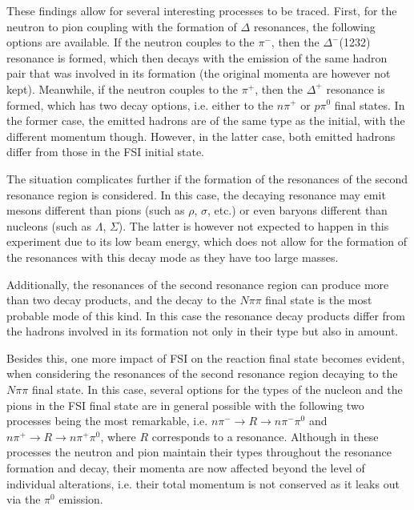 These findings allow for several interesting processes to be traced. First, for the neutron to pion coupling with the formation of $\Delta$ resonances, the following options are available. If the neutron couples to the $\pi^{-}$, then the $\Delta^{-}$(1232) resonance is formed, which then decays with the emission of the same hadron pair that was involved in its formation (the original momenta are however not kept). Meanwhile, if the neutron couples to the $\pi^{+}$, then the $\Delta^{+}$ resonance is formed, which has two decay options, i.e. either to the $n\pi^{+}$ or $p\pi^{0}$ final states. In the former case, the emitted hadrons are of the same type as the initial, with the different momentum though. However, in the latter case, both emitted hadrons differ from those in the FSI initial state.

The situation complicates further if the formation of the resonances of the second resonance region is considered. In this case, the decaying resonance may emit mesons different than pions (such as $\rho$, $\sigma$, etc.) or even baryons different than nucleons (such as $\Lambda$, $\Sigma$). The latter is however not expected to happen in this experiment due to its low beam energy, which does not allow for the formation of the resonances with this decay mode as they have too large masses.

Additionally, the resonances of the second resonance region can produce more than two decay products, and the decay to the $N\pi\pi$ final state is the most probable mode of this kind. In this case the resonance decay products differ from the hadrons involved in its formation not only in their type but also in amount.%

Besides this, one more impact of FSI on the reaction final state becomes evident, when considering the resonances of the second resonance region decaying to the $N\pi\pi$ final state. In this case, several options for the types of the nucleon and the pions in the FSI final state are in general possible with the following two processes being the most remarkable, i.e. $n\pi^{-}\rightarrow R\rightarrow n\pi^{-}\pi^{0}$ and $n\pi^{+}\rightarrow R\rightarrow n\pi^{+}\pi^{0}$, where $R$ corresponds to a resonance. Although in these processes the neutron and pion maintain their types throughout the resonance formation and decay, their momenta are now affected beyond the level of individual alterations, i.e. their total momentum is not conserved as it leaks out via the $\pi^{0}$ emission.


